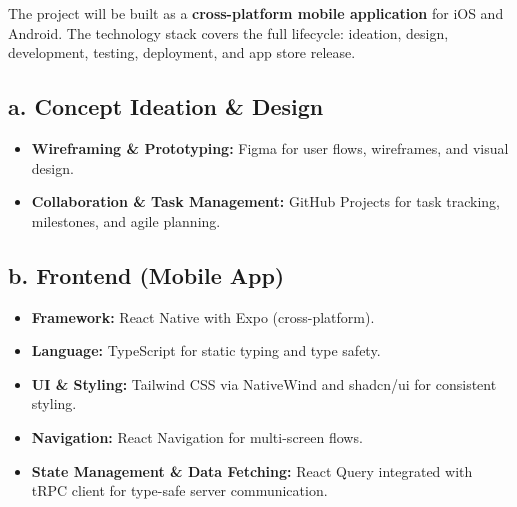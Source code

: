 \documentclass{article}
\begin{document}



The project will be built as a \textbf{cross-platform mobile application} for iOS and Android. The technology stack covers the full lifecycle: ideation, design, development, testing, deployment, and app store release.

\subsection*{a. Concept Ideation \& Design}
\begin{itemize}
    \item \textbf{Wireframing \& Prototyping:} Figma for user flows, wireframes, and visual design.
    \item \textbf{Collaboration \& Task Management:} GitHub Projects for task tracking, milestones, and agile planning.
\end{itemize}

\subsection*{b. Frontend (Mobile App)}
\begin{itemize}
    \item \textbf{Framework:} React Native with Expo (cross-platform).
    \item \textbf{Language:} TypeScript for static typing and type safety.
    \item \textbf{UI \& Styling:} Tailwind CSS via NativeWind and shadcn/ui for consistent styling.
    \item \textbf{Navigation:} React Navigation for multi-screen flows.
    \item \textbf{State Management \& Data Fetching:} React Query integrated with tRPC client for type-safe server communication.
\end{itemize}
\end{document}
